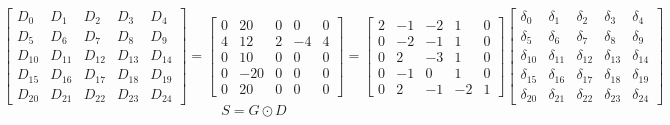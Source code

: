 \documentclass{article}%
\begin{document}
\[%
\left[\begin{matrix}D_{0} & D_{1} & D_{2} & D_{3} & D_{4}\\D_{5} & D_{6} & D_{7} & D_{8} & D_{9}\\D_{10} & D_{11} & D_{12} & D_{13} & D_{14}\\D_{15} & D_{16} & D_{17} & D_{18} & D_{19}\\D_{20} & D_{21} & D_{22} & D_{23} & D_{24}\end{matrix}\right] = \left[\begin{matrix}0 & 20 & 0 & 0 & 0\\4 & 12 & 2 & -4 & 4\\0 & 10 & 0 & 0 & 0\\0 & -20 & 0 & 0 & 0\\0 & 20 & 0 & 0 & 0\end{matrix}\right] = \left[\begin{matrix}2 & -1 & -2 & 1 & 0\\0 & -2 & -1 & 1 & 0\\0 & 2 & -3 & 1 & 0\\0 & -1 & 0 & 1 & 0\\0 & 2 & -1 & -2 & 1\end{matrix}\right] \left[\begin{matrix}\delta_{0} & \delta_{1} & \delta_{2} & \delta_{3} & \delta_{4}\\\delta_{5} & \delta_{6} & \delta_{7} & \delta_{8} & \delta_{9}\\\delta_{10} & \delta_{11} & \delta_{12} & \delta_{13} & \delta_{14}\\\delta_{15} & \delta_{16} & \delta_{17} & \delta_{18} & \delta_{19}\\\delta_{20} & \delta_{21} & \delta_{22} & \delta_{23} & \delta_{24}\end{matrix}\right]%
\]%
\[%
S = G \odot D%
\]%
\end{document}
